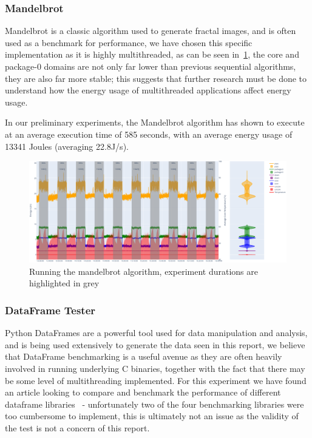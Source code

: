 \subsubsection{Mandelbrot}
Mandelbrot is a classic algorithm used to generate fractal images, and is often used as a benchmark for performance, we
have chosen this specific implementation as it is highly multithreaded, as can be seen in~\ref{fig:mandelbrot_repeating},
the core and package-0 domains are not only far lower than previous sequential algorithms, they are also far more stable;
this suggests that further research must be done to understand how the energy usage of multithreaded applications
affect energy usage.

In our preliminary experiments, the Mandelbrot algorithm has shown to execute at an average execution time of 585
seconds, with an average energy usage of 13341 Joules (averaging 22.8J/s).

\begin{figure}[H]
    \centering
    \includegraphics[width=15cm]{figures/implementation/mandelbrot_repeating}
    \caption{Running the mandelbrot algorithm, experiment durations are highlighted in grey}
    \label{fig:mandelbrot_repeating}
\end{figure}

\subsubsection{DataFrame Tester}
Python DataFrames are a powerful tool used for data manipulation and analysis, and is being used extensively to generate
the data seen in this report, we believe that DataFrame benchmarking is a useful avenue as they are often heavily
involved in running underlying C binaries, together with the fact that there may be some level of multithreading
implemented.
For this experiment we have found an article looking to compare and benchmark the performance of different dataframe
libraries~\cite{DataframeBenchmark} - unfortunately two of the four benchmarking libraries were too cumbersome to
implement, this is ultimately not an issue as the validity of the test is not a concern of this report.

